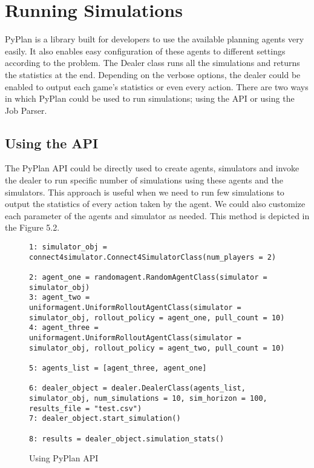 \documentclass[double,12pt]{beavtex}
\begin{document}
\section{Running Simulations}

PyPlan is a library built for developers to use the available planning agents very easily. It also enables easy configuration of these agents to different settings according to the problem. The Dealer class runs all the simulations and returns the statistics at the end. Depending on the verbose options, the dealer could be enabled to output each game's statistics or even every action. There are two ways in which PyPlan could be used to run simulations; using the API or using the Job Parser.

\subsection{Using the API}
The PyPlan API could be directly used to create agents, simulators and invoke the dealer to run specific number of simulations using these agents and the simulators. This approach is useful when we need to run few simulations to output the statistics of every action taken by the agent. We could also customize each parameter of the agents and simulator as needed. This method is depicted in the Figure 5.2.

\begin{figure}[!ht]
\begin{lstlisting}
1: simulator_obj = connect4simulator.Connect4SimulatorClass(num_players = 2)

2: agent_one = randomagent.RandomAgentClass(simulator = simulator_obj)
3: agent_two = uniformagent.UniformRolloutAgentClass(simulator = simulator_obj, rollout_policy = agent_one, pull_count = 10)
4: agent_three = uniformagent.UniformRolloutAgentClass(simulator = simulator_obj, rollout_policy = agent_two, pull_count = 10)

5: agents_list = [agent_three, agent_one]

6: dealer_object = dealer.DealerClass(agents_list, simulator_obj, num_simulations = 10, sim_horizon = 100, results_file = "test.csv")
7: dealer_object.start_simulation()

8: results = dealer_object.simulation_stats()
\end{lstlisting}
\caption{Using PyPlan API}
\end{figure}
\end{document}
